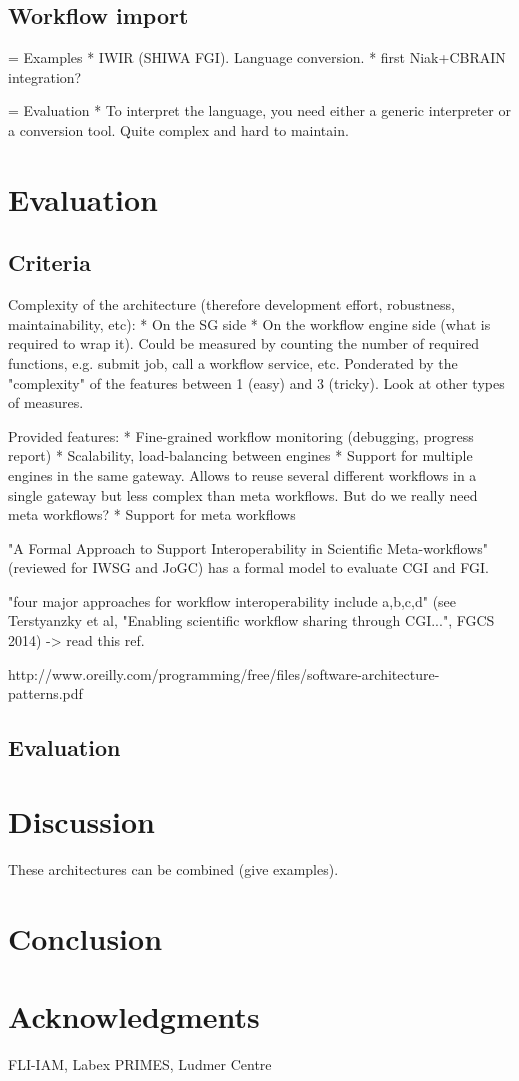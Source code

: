 \documentclass[preprint,3p,twocolumn]{elsarticle}
\begin{document}
\subsection{Workflow import}

= Examples
* IWIR (SHIWA FGI). Language conversion.
* first Niak+CBRAIN integration?

= Evaluation
* To interpret the language, you need either a generic interpreter or a conversion tool. Quite complex and hard to  maintain.

\section{Evaluation}

\subsection{Criteria}

Complexity of the architecture (therefore development effort, robustness, maintainability, etc):
  * On the SG side
  * On the workflow engine side (what is required to wrap it).
Could be measured by counting the number of required functions,
e.g. submit job, call a workflow service, etc. Ponderated by the
"complexity" of the features between 1 (easy) and 3 (tricky). Look at
other types of measures.

Provided features:
  * Fine-grained workflow monitoring (debugging, progress report)
  * Scalability, load-balancing between engines
  * Support for multiple engines in the same gateway. Allows to reuse several different workflows in a single gateway but less complex than meta workflows. But do we really need meta workflows?
  * Support for meta workflows

"A Formal Approach to Support Interoperability in Scientific
Meta-workflows" (reviewed for IWSG and JoGC) has a formal model to
evaluate CGI and FGI.

"four major approaches for workflow interoperability include a,b,c,d" (see Terstyanzky et al, "Enabling scientific workflow sharing through CGI...", FGCS 2014) -> read this ref.

http://www.oreilly.com/programming/free/files/software-architecture-patterns.pdf

\subsection{Evaluation}

\section{Discussion}

These architectures can be combined (give examples). 

\section{Conclusion}

\section{Acknowledgments}

FLI-IAM, Labex PRIMES, Ludmer Centre

 

\end{document}
